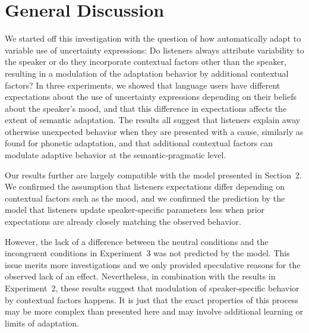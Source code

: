 \documentclass[man,floatsintext]{apa6}
\newcommand{\jd}[1]{\textcolor{Purple}{\bf [jd: #1]}}
\begin{document}

\section{General Discussion}

We started off this investigation with the question of how automatically adapt to variable use of uncertainty expressions: Do listeners always attribute variability to the speaker or do they incorporate contextual factors other than the speaker, resulting in a modulation of the adaptation behavior by additional contextual factors? In three experiments, we showed that language users have different expectations about the use of uncertainty expressions depending on their beliefs about the speaker's mood, and that this difference in expectations affects the extent of semantic adaptation. The results all suggest that listeners explain away otherwise unexpected behavior when they are presented with a cause, similarly as  found for phonetic adaptation, and that additional contextual factors can modulate adaptive behavior at the semantic-pragmatic level.

Our results further are largely compatible with the model presented in Section~2. We confirmed the assumption that listeners expectations differ depending on contextual factors such as the mood, and we confirmed the prediction by the model that listeners update speaker-specific parameters less when prior expectations are already closely matching the observed behavior.  

However, the lack of a difference between the neutral conditions and the incongruent conditions in Experiment~3 was not predicted by the model. This issue merits more investigations and we only provided speculative reasons for the observed lack of an effect. Nevertheless, in combination with the results in Experiment~2,  these results suggest that modulation of speaker-specific behavior by contextual factors happens. It is just that the exact properties of this process may be more complex than presented here and may involve additional learning or limits of adaptation.
\end{document}
